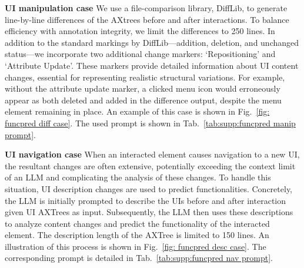 \noindent\textbf{UI manipulation case} We use a file-comparison library, DiffLib, to generate line-by-line differences of the AXtrees before and after interactions. To balance efficiency with annotation integrity, we limit the differences to 250 lines. In addition to the standard markings by DiffLib—addition, deletion, and unchanged status—we incorporate two additional change markers: `Repositioning' and `Attribute Update'. These markers provide detailed information about UI content changes, essential for representing realistic structural variations. For example, without the attribute update marker, a clicked menu icon would erroneously appear as both deleted and added in the difference output, despite the menu element remaining in place. An example of this case is shown in Fig.~\ref{fig: funcpred diff case}. The used prompt is shown in Tab.~\ref{tab:supp:funcpred manip prompt}.





\noindent\textbf{UI navigation case} When an interacted element causes navigation to a new UI, the resultant changes are often extensive, potentially exceeding the context limit of an LLM and complicating the analysis of these changes. To handle this situation, UI description changes are used to predict functionalities. Concretely, the LLM is initially prompted to describe the UIs before and after interaction given UI AXTrees as input. Subsequently, the LLM then uses these descriptions to analyze content changes and predict the functionality of the interacted element. The description length of the AXTree is limited to 150 lines. An illustration of this process is shown in Fig.~\ref{fig: funcpred desc case}. The corresponding prompt is detailed in Tab.~\ref{tab:supp:funcpred nav prompt}.




